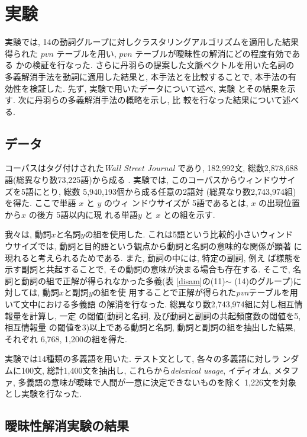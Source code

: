 \vspace*{-2mm}
\section{実験}

実験では, 14の動詞グループに対しクラスタリングアルゴリズムを適用した結果得られた
$pvn$ テーブルを用い, $pvn$ テーブルが曖昧性の解消にどの程度有効である
かの検証を行なった.  さらに丹羽らの提案した文脈ベクトルを用いた名詞の
多義解消手法を動詞に適用した結果と, 本手法とを比較することで, 
本手法の有効性を検証した.  先ず, 実験で用いたデータについて述べ, 実験
とその結果を示す.  次に丹羽らの多義解消手法の概略を示し, 比
較を行なった結果について述べる.

\vspace*{-2mm}
\subsection{データ}

コーパスはタグ付けされた{\it Wall Street Journal} であり, 182,992文, 
総数2,878,688語(総異なり数73,225語)から成る
\cite{Liberman1991}.  実験では, このコーパスからウィンドウサイズを5語にとり, 総数
5,940,193個から成る任意の2語対 (総異なり数2,743,974組)を得た.  ここで単語 $x$ と $y$ のウィ
ンドウサイズが 5語であるとは, $x$ の出現位置から$x$ の後方 5語以内に現
れる単語$y$ と $x$ との組を示す.

我々は, 動詞$x$と名詞$y$の組を使用した.  これは5語という比較的小さいウィンド
ウサイズでは, 動詞と目的語という観点から動詞と名詞の意味的な関係が顕著
に現れると考えられるためである.  また, 動詞の中には, 特定の副詞, 例え
ば様態を示す副詞と共起することで, その動詞の意味が決まる場合も存在する. 
そこで, 名詞と動詞の組で正解が得られなかった多義(表
\ref{disam}の(11)$\sim$ (14)のグループ)に対しては, 動詞$x$と副詞$y$の組を使
用することで正解が得られた{\it pvn}テーブルを用いて文中における多義語
の解消を行なった.  総異なり数2,743,974組に対し相互情報量を計算し, 一定
の閾値(動詞と名詞, 及び動詞と副詞の共起頻度数の閾値を5, 相互情報量
の閾値を3)以上である動詞と名詞, 動詞と副詞の組を抽出した結果, それぞれ
6,768, 1,200の組を得た.

実験では14種類の多義語を用いた.  テスト文として, 各々の多義語に対しラ
ンダムに100文, 総計1,400文を抽出し, これらから{\it delexical usage}, 
イディオム, メタファ, 多義語の意味が曖昧で人間が一意に決定できないものを除く
1,226文を対象とし実験を行なった.

\subsection{曖昧性解消実験の結果}

